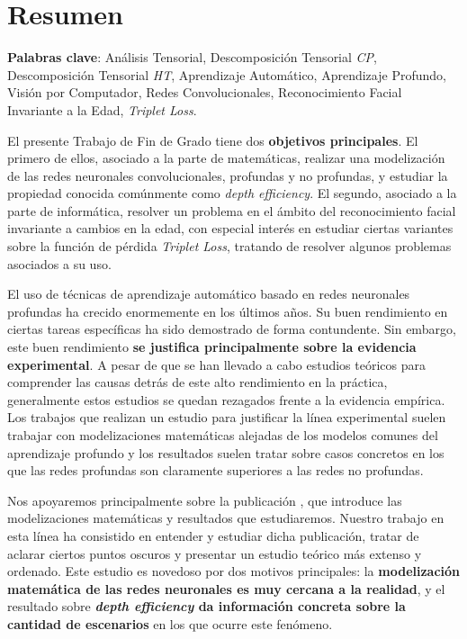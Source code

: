 %



\chapter{Resumen}

\textbf{Palabras clave}: Análisis Tensorial, Descomposición Tensorial \textit{CP}, Descomposición Tensorial \textit{HT}, Aprendizaje Automático, Aprendizaje Profundo, Visión por Computador, Redes Convolucionales, Reconocimiento Facial Invariante a la Edad, \textit{Triplet Loss}.

El presente Trabajo de Fin de Grado tiene dos \textbf{objetivos principales}. El primero de ellos, asociado a la parte de matemáticas, realizar una modelización de las redes neuronales convolucionales, profundas y no profundas, y estudiar la propiedad conocida comúnmente como \textit{depth efficiency}. El segundo, asociado a la parte de informática, resolver un problema en el ámbito del reconocimiento facial invariante a cambios en la edad, con especial interés en estudiar ciertas variantes sobre la función de pérdida \textit{Triplet Loss}, tratando de resolver algunos problemas asociados a su uso.

El uso de técnicas de aprendizaje automático basado en redes neuronales profundas ha crecido enormemente en los últimos años. Su buen rendimiento en ciertas tareas específicas ha sido demostrado de forma contundente. Sin embargo, este buen rendimiento \textbf{se justifica principalmente sobre la evidencia experimental}. A pesar de que se han llevado a cabo estudios teóricos para comprender las causas detrás de este alto rendimiento en la práctica, generalmente estos estudios se quedan rezagados frente a la evidencia empírica. Los trabajos que realizan un estudio para justificar la línea experimental suelen trabajar con modelizaciones matemáticas alejadas de los modelos comunes del aprendizaje profundo y los resultados suelen tratar sobre casos concretos en los que las redes profundas son claramente superiores a las redes no profundas.

Nos apoyaremos principalmente sobre la publicación \cite{matematicas:principal}, que introduce las modelizaciones matemáticas y resultados que estudiaremos. Nuestro trabajo en esta línea ha consistido en entender y estudiar dicha publicación, tratar de aclarar ciertos puntos oscuros y presentar un estudio teórico más extenso y ordenado. Este estudio es novedoso por dos motivos principales: la \textbf{modelización matemática de las redes neuronales es muy cercana a la realidad}, y el resultado sobre \textbf{\textit{depth efficiency} da información concreta sobre la cantidad de escenarios} en los que ocurre este fenómeno.

